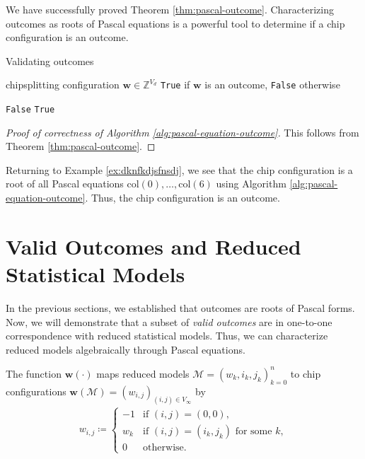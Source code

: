 We have successfully proved Theorem \ref{thm:pascal-outcome}. Characterizing outcomes as roots of Pascal equations is a powerful tool to determine if a chip configuration is an outcome.

\begin{algorithm}[H]
\caption{Validating outcomes}\label{alg:pascal-equation-outcome}
    \begin{algorithmic}[1]
    \Require chipsplitting configuration \( \mathbf w \in \mathbb{Z}^{V_d} \)
    \Ensure \texttt{True} if \( \mathbf w \) is an outcome, \texttt{False} otherwise

        \State \Return \texttt{False}
        \EndIf
    \EndFor
    \State \Return \texttt{True}
    \EndFunction
    \end{algorithmic}  
\end{algorithm}

\begin{proof}[Proof of correctness of Algorithm \ref{alg:pascal-equation-outcome}]
    This follows from Theorem \ref{thm:pascal-outcome}.
\end{proof}

\begin{example}
    Returning to Example \ref{ex:dknfkdjsfnsdj}, we see that the chip configuration is a root of all Pascal equations \( \mathrm{col}(0), \dots, \mathrm{col}(6) \) using Algorithm \ref{alg:pascal-equation-outcome}. Thus, the chip configuration is an outcome.
\end{example}

\section{Valid Outcomes and Reduced Statistical Models}

In the previous sections, we established that outcomes are roots of Pascal forms. Now, we will demonstrate that a subset of \emph{valid outcomes} are in one-to-one correspondence with reduced statistical models. Thus, we can characterize reduced models algebraically through Pascal equations.

The function \( \mathbf w(\cdot) \) maps reduced models \( \mathcal{M} = (w_k, i_k, j_k)^{n}_{k=0} \) to chip configurations \( \mathbf w(\mathcal{M}) = (w_{i,j})_{(i,j) \in V_\infty} \) by 
\begin{align*}
    w_{i,j} \coloneqq \begin{cases}
        -1 & \text{if } (i,j) = (0,0), \\
        w_k & \text{if } (i,j) = (i_k, j_k) \text{ for some } k, \\
        0 & \text{otherwise}.
    \end{cases}
\end{align*}

